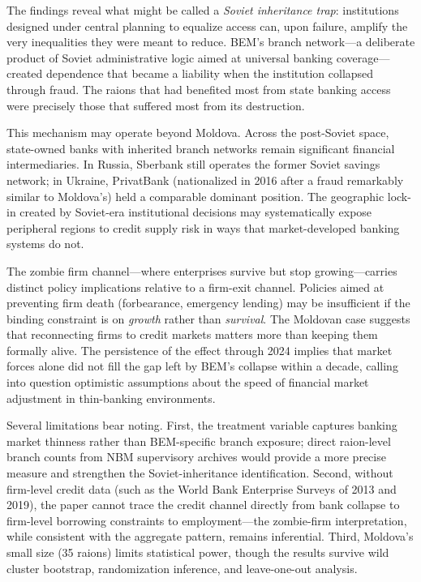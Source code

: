 \documentclass[12pt]{article}
\begin{document}
The findings reveal what might be called a \emph{Soviet inheritance trap}: institutions designed under central planning to equalize access can, upon failure, amplify the very inequalities they were meant to reduce. BEM's branch network---a deliberate product of Soviet administrative logic aimed at universal banking coverage---created dependence that became a liability when the institution collapsed through fraud. The raions that had benefited most from state banking access were precisely those that suffered most from its destruction.

This mechanism may operate beyond Moldova. Across the post-Soviet space, state-owned banks with inherited branch networks remain significant financial intermediaries. In Russia, Sberbank still operates the former Soviet savings network; in Ukraine, PrivatBank (nationalized in 2016 after a fraud remarkably similar to Moldova's) held a comparable dominant position. The geographic lock-in created by Soviet-era institutional decisions may systematically expose peripheral regions to credit supply risk in ways that market-developed banking systems do not.

The zombie firm channel---where enterprises survive but stop growing---carries distinct policy implications relative to a firm-exit channel. Policies aimed at preventing firm death (forbearance, emergency lending) may be insufficient if the binding constraint is on \emph{growth} rather than \emph{survival}. The Moldovan case suggests that reconnecting firms to credit markets matters more than keeping them formally alive. The persistence of the effect through 2024 implies that market forces alone did not fill the gap left by BEM's collapse within a decade, calling into question optimistic assumptions about the speed of financial market adjustment in thin-banking environments.

Several limitations bear noting. First, the treatment variable captures banking market thinness rather than BEM-specific branch exposure; direct raion-level branch counts from NBM supervisory archives would provide a more precise measure and strengthen the Soviet-inheritance identification. Second, without firm-level credit data (such as the World Bank Enterprise Surveys of 2013 and 2019), the paper cannot trace the credit channel directly from bank collapse to firm-level borrowing constraints to employment---the zombie-firm interpretation, while consistent with the aggregate pattern, remains inferential. Third, Moldova's small size (35 raions) limits statistical power, though the results survive wild cluster bootstrap, randomization inference, and leave-one-out analysis.
\end{document}
